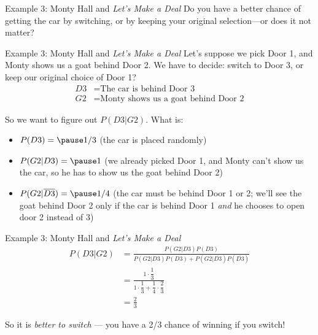 \documentclass{beamer}\usepackage[]{graphicx}\usepackage[]{color}
\begin{document}
\begin{darkframes}
\begin{frame}{Example 3: Monty Hall and \emph{Let's Make a Deal}}
  Do you have a better chance of getting the car by switching, or by keeping your original selection---or does it not matter?
  \lc
\end{frame}

\begin{frame}{Example 3: Monty Hall and \emph{Let's Make a Deal}}
  Let's suppose we pick Door 1, and Monty shows us a goat behind Door 2. We have to decide: switch to Door 3, or keep our original choice of Door 1?
  \begin{align*}
    D3 &= \text{The car is behind Door 3} \\
    G2 &= \text{Monty shows us a goat behind Door 2}
  \end{align*}

  So we want to figure out $P(D3|G2)$. What is:
  \begin{itemize}[<+->]
    \item $P(D3) = \pause 1/3$ (the car is placed randomly)
    \item $P(G2|D3) = \pause 1$ (we already picked Door 1, and Monty can't show us the car, so he has to show us the goat behind Door 2)
    \item $P(G2|\overline{D3}) = \pause 1/4$ (the car must be behind Door 1 or 2; we'll see the goat behind Door 2 only if the car is behind Door 1 \emph{and} he chooses to open door 2 instead of 3)
  \end{itemize}
\end{frame}

\begin{frame}{Example 3: Monty Hall and \emph{Let's Make a Deal}}
  \begin{align*}
    P(D3|G2) &= \frac{ P(G2|D3)P(D3) }{ P(G2|D3)P(D3) + P(G2|\overline{D3})P(\overline{D3}) } \\
    &= \frac{ 1 \cdot \dfrac 1 3 }{ 1 \cdot \dfrac 1 3 + \dfrac 1 4 \cdot \dfrac 2 3 } \\
    &= \frac 2 3
  \end{align*}
  \pause

  So it is \emph{better to switch} --- you have a 2/3 chance of winning if you switch!
\end{frame}

\end{darkframes}
\end{document}
